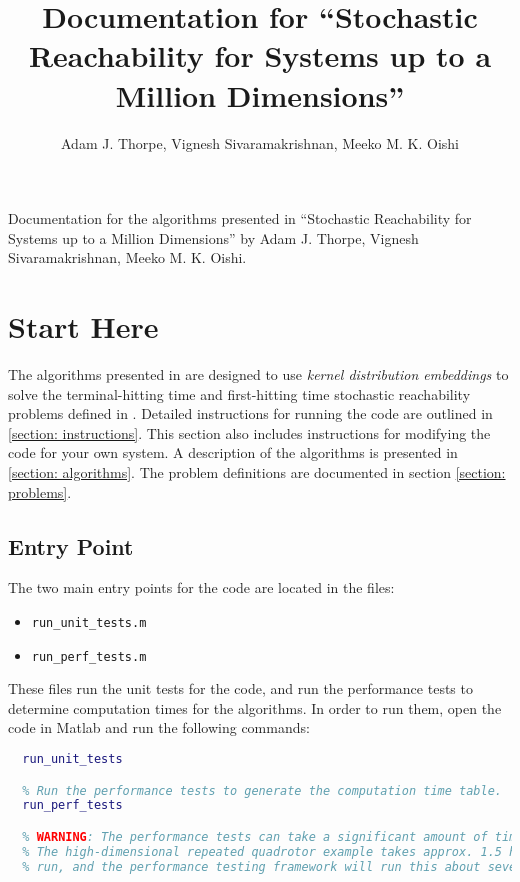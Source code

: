 \documentclass[11pt]{article}
\title{%
  Documentation for
  ``Stochastic Reachability for Systems up to a Million Dimensions''
}
\author{Adam J. Thorpe, Vignesh Sivaramakrishnan, Meeko M. K. Oishi}
\begin{document}

\maketitle


Documentation for the algorithms presented in ``Stochastic Reachability for Systems up to a Million Dimensions'' by Adam J. Thorpe, Vignesh Sivaramakrishnan, Meeko M. K. Oishi.

\tableofcontents

\newpage

\printnoidxglossary[type=symbols,style=long,title={List of Symbols}]

\newpage


\section{Start Here}

The algorithms presented in \cite{thorpe} are designed to use \emph{kernel distribution embeddings} \cite{grunewalder} to solve the terminal-hitting time and first-hitting time stochastic reachability problems defined in \cite{abate, summers}.
%
Detailed instructions for running the code are outlined in \ref{section: instructions}. This section also includes instructions for modifying the code for your own system.
A description of the algorithms is presented in \ref{section: algorithms}.
The problem definitions are documented in section \ref{section: problems}.

\subsection{Entry Point}

The two main entry points for the code are located in the files:
\begin{itemize}
  \item \verb|run_unit_tests.m|
  \item \verb|run_perf_tests.m|
\end{itemize}
These files run the unit tests for the code, and run the performance tests to determine computation times for the algorithms. In order to run them, open the code in Matlab and run the following commands:
\begin{lstlisting}[language=Matlab]
  % Run the unit tests for the code.
  run_unit_tests

  % Run the performance tests to generate the computation time table.
  run_perf_tests

  % WARNING: The performance tests can take a significant amount of time to run.
  % The high-dimensional repeated quadrotor example takes approx. 1.5 hours to
  % run, and the performance testing framework will run this about seven times.
\end{lstlisting}
\end{document}
